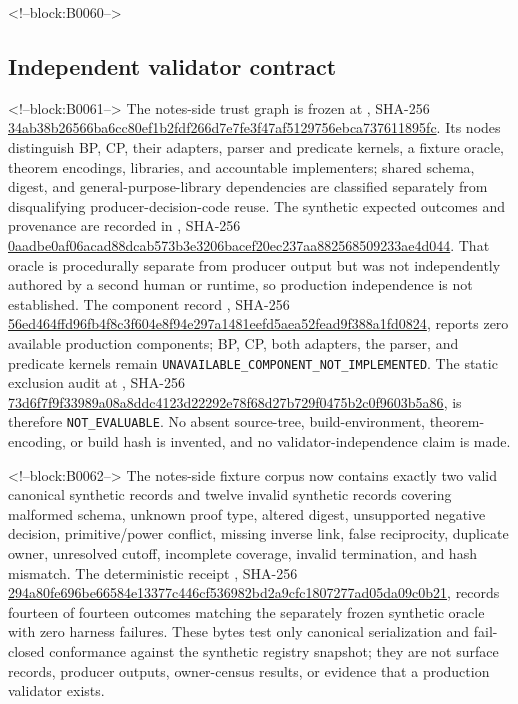 \documentclass[11pt,a4paper]{article}
\begin{document}
<!--block:B0060-->
\hypertarget{independent-validator-contract}{%
\subsection{Independent validator contract}\label{independent-validator-contract}}

<!--block:B0061-->
The notes-side trust graph is frozen at , SHA-256 \url{34ab38b26566ba6cc80ef1b2fdf266d7e7fe3f47af5129756ebca737611895fc}. Its nodes distinguish BP, CP, their adapters, parser and predicate kernels, a fixture oracle, theorem encodings, libraries, and accountable implementers; shared schema, digest, and general-purpose-library dependencies are classified separately from disqualifying producer-decision-code reuse. The synthetic expected outcomes and provenance are recorded in , SHA-256 \url{0aadbe0af06acad88dcab573b3e3206bacef20ec237aa882568509233ae4d044}. That oracle is procedurally separate from producer output but was not independently authored by a second human or runtime, so production independence is not established. The component record , SHA-256 \url{56ed464ffd96fb4f8c3f604e8f94e297a1481eefd5aea52fead9f388a1fd0824}, reports zero available production components; BP, CP, both adapters, the parser, and predicate kernels remain \texttt{UNAVAILABLE\_COMPONENT\_NOT\_IMPLEMENTED}. The static exclusion audit at , SHA-256 \url{73d6f7f9f33989a08a8ddc4123d22292e78f68d27b729f0475b2c0f9603b5a86}, is therefore \texttt{NOT\_EVALUABLE}. No absent source-tree, build-environment, theorem-encoding, or build hash is invented, and no validator-independence claim is made.

<!--block:B0062-->
The notes-side fixture corpus now contains exactly two valid canonical synthetic records and twelve invalid synthetic records covering malformed schema, unknown proof type, altered digest, unsupported negative decision, primitive/power conflict, missing inverse link, false reciprocity, duplicate owner, unresolved cutoff, incomplete coverage, invalid termination, and hash mismatch. The deterministic receipt , SHA-256 \url{294a80fe696be66584e13377c446cf536982bd2a9cfc1807277ad05da09c0b21}, records fourteen of fourteen outcomes matching the separately frozen synthetic oracle with zero harness failures. These bytes test only canonical serialization and fail-closed conformance against the synthetic registry snapshot; they are not surface records, producer outputs, owner-census results, or evidence that a production validator exists.
\end{document}
